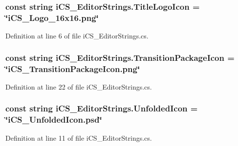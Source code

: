 \hypertarget{classi_c_s___editor_strings_a93c0ec111759a09816d0808d77a91c8d}{
\subsubsection[{Title\+Logo\+Icon}]{\setlength{\rightskip}{0pt plus 5cm}const string i\+C\+S\+\_\+\+Editor\+Strings.\+Title\+Logo\+Icon = \char`\"{}i\+C\+S\+\_\+\+Logo\+\_\+16x16.\+png\char`\"{}}}\label{classi_c_s___editor_strings_a93c0ec111759a09816d0808d77a91c8d}


Definition at line 6 of file i\+C\+S\+\_\+\+Editor\+Strings.\+cs.

\hypertarget{classi_c_s___editor_strings_a5b5dbbcfa09c6b446fba9a33ab38e7c5}{
\subsubsection[{Transition\+Package\+Icon}]{\setlength{\rightskip}{0pt plus 5cm}const string i\+C\+S\+\_\+\+Editor\+Strings.\+Transition\+Package\+Icon = \char`\"{}i\+C\+S\+\_\+\+Transition\+Package\+Icon.\+png\char`\"{}}}\label{classi_c_s___editor_strings_a5b5dbbcfa09c6b446fba9a33ab38e7c5}


Definition at line 22 of file i\+C\+S\+\_\+\+Editor\+Strings.\+cs.

\hypertarget{classi_c_s___editor_strings_addfb1e5968a7e181849926752908bb22}{
\subsubsection[{Unfolded\+Icon}]{\setlength{\rightskip}{0pt plus 5cm}const string i\+C\+S\+\_\+\+Editor\+Strings.\+Unfolded\+Icon = \char`\"{}i\+C\+S\+\_\+\+Unfolded\+Icon.\+psd\char`\"{}}}\label{classi_c_s___editor_strings_addfb1e5968a7e181849926752908bb22}


Definition at line 11 of file i\+C\+S\+\_\+\+Editor\+Strings.\+cs.

